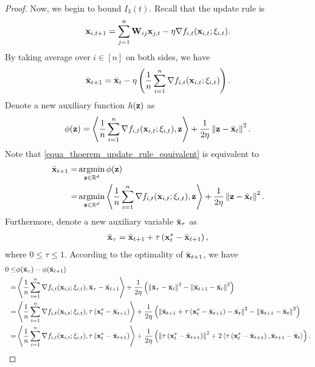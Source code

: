 \documentclass{article}
\begin{document}
\begin{proof}
Now, we begin to bound $I_3(t)$. Recall that the update rule is 
\begin{align}
\nonumber
{\bf x}_{i,t+1} = \sum_{j=1}^n {\bf W}_{ij}{\bf x}_{j,t} - \eta \nabla f_{i,t}({\bf x}_{i,t};\xi_{i,t}).
\end{align} By taking average over $i\in[n]$ on both sides, we have 
\begin{align}
\label{equa_thoerem_update_rule_equivalent}
\bar{{\bf x}}_{t+1} = \bar{{\bf x}}_t - \eta \left( \frac{1}{n}\sum_{i=1}^n \nabla f_{i,t}({\bf x}_{i,t};\xi_{i,t}) \right).
\end{align} 
Denote a new auxiliary function $h({\bf z})$ as 
\begin{align}
\nonumber
\phi({\bf z}) = \left\langle\frac{1}{n}\sum_{i=1}^n \nabla f_{i,t}({\bf x}_{i,t};\xi_{i,t}), {\bf z} \right\rangle + \frac{1}{2\eta}\left\lVert{\bf z} - \bar{{\bf x}}_t\right\rVert^2.
\end{align} Note that \eqref{equa_thoerem_update_rule_equivalent} is equivalent to 
\begin{align}
\nonumber
\bar{\x}_{t+1} = & \argmin_{\z\in\RR^d} \phi(\z) \\ \nonumber
= & \argmin_{\z\in\RR^d} \lrangle{\frac{1}{n}\sum_{i=1}^n \nabla f_{i,t}(\x_{i,t};\xi_{i,t}), \z} + \frac{1}{2\eta}\lrnorm{\z - \bar{\x}_t}^2.
\end{align} Furthermore, denote a new auxiliary variable $\bar{{\bf x}}_{\tau}$ as  
\begin{align}
\nonumber
\bar{{\bf x}}_{\tau} = \bar{{\bf x}}_{t+1} + \tau \left( {\bf x}_t^\ast - \bar{{\bf x}}_{t+1} \right),
\end{align} where $0\le \tau \le 1$. According to the optimality of $\bar{{\bf x}}_{t+1}$, we have
\begin{align}
\nonumber
0 \le & \phi(\bar{\x}_{\tau}) - \phi(\bar{\x}_{t+1}) \\ \nonumber
= & \lrangle{\frac{1}{n}\sum_{i=1}^n \nabla f_{i,t}(\x_{i,t};\xi_{i,t}), \bar{\x}_{\tau} - \bar{\x}_{t+1}} + \frac{1}{2\eta}\lrincir{ \lrnorm{\bar{\x}_{\tau} - \bar{\x}_t}^2 - \lrnorm{\bar{\x}_{t+1} - \bar{\x}_t}^2 } \\ \nonumber
= & \lrangle{\frac{1}{n}\sum_{i=1}^n \nabla f_{i,t}(\x_{i,t};\xi_{i,t}), \tau \lrincir{\x_t^\ast - \bar{\x}_{t+1}}} + \frac{1}{2\eta}\lrincir{ \lrnorm{\bar{\x}_{t+1} + \tau \lrincir{\x_t^\ast - \bar{\x}_{t+1}} - \bar{\x}_t}^2 - \lrnorm{\bar{\x}_{t+1} - \bar{\x}_t}^2 } \\ \nonumber
= & \lrangle{\frac{1}{n}\sum_{i=1}^n \nabla f_{i,t}(\x_{i,t};\xi_{i,t}), \tau \lrincir{\x_t^\ast - \bar{\x}_{t+1}}} + \frac{1}{2\eta}\lrincir{ \lrnorm{\tau \lrincir{\x_t^\ast - \bar{\x}_{t+1}}}^2 + 2\lrangle{\tau \lrincir{\x_t^\ast - \bar{\x}_{t+1}}, \bar{\x}_{t+1} - \bar{\x}_t } }.

\end{align}
\end{proof}
\end{document}
